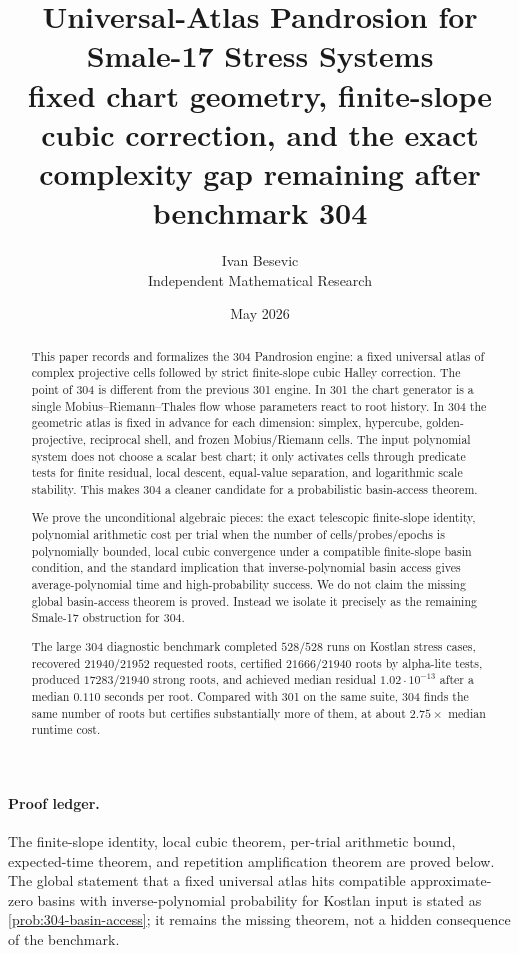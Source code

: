 \documentclass[11pt]{article}
\title{Universal-Atlas Pandrosion for Smale-17 Stress Systems\\[3pt]
\large fixed chart geometry, finite-slope cubic correction, and the exact complexity gap remaining after benchmark 304}
\author{Ivan Besevic\\Independent Mathematical Research}
\date{May 2026}
\begin{document}
\maketitle

\begin{abstract}
This paper records and formalizes the 304 Pandrosion engine: a fixed universal atlas of complex projective cells followed by strict finite-slope cubic Halley correction.  The point of 304 is different from the previous 301 engine.  In 301 the chart generator is a single Mobius--Riemann--Thales flow whose parameters react to root history.  In 304 the geometric atlas is fixed in advance for each dimension: simplex, hypercube, golden-projective, reciprocal shell, and frozen Mobius/Riemann cells.  The input polynomial system does not choose a scalar best chart; it only activates cells through predicate tests for finite residual, local descent, equal-value separation, and logarithmic scale stability.  This makes 304 a cleaner candidate for a probabilistic basin-access theorem.

We prove the unconditional algebraic pieces: the exact telescopic finite-slope identity, polynomial arithmetic cost per trial when the number of cells/probes/epochs is polynomially bounded, local cubic convergence under a compatible finite-slope basin condition, and the standard implication that inverse-polynomial basin access gives average-polynomial time and high-probability success.  We do not claim the missing global basin-access theorem is proved.  Instead we isolate it precisely as the remaining Smale-17 obstruction for 304.

The large 304 diagnostic benchmark completed $528/528$ runs on Kostlan stress cases, recovered $21940/21952$ requested roots, certified $21666/21940$ roots by alpha-lite tests, produced $17283/21940$ strong roots, and achieved median residual $1.02\cdot10^{-13}$ after a median $0.110$ seconds per root.  Compared with 301 on the same suite, 304 finds the same number of roots but certifies substantially more of them, at about $2.75\times$ median runtime cost.
\end{abstract}

\paragraph{Proof ledger.}
The finite-slope identity, local cubic theorem, per-trial arithmetic bound, expected-time theorem, and repetition amplification theorem are proved below.  The global statement that a fixed universal atlas hits compatible approximate-zero basins with inverse-polynomial probability for Kostlan input is stated as \cref{prob:304-basin-access}; it remains the missing theorem, not a hidden consequence of the benchmark.
\end{document}
